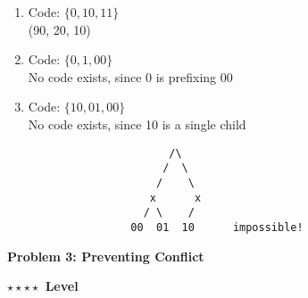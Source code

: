 \documentclass{article}\usepackage[utf8]{inputenc}
\begin{document}
\begin{enumerate}
\item Code: $\{0, 10, 11\}$
\BeginSolution %
\\
(90, 20, 10)
\EndSolution
\item Code: $\{0, 1, 00\}$
\BeginSolution %
\\
No code exists, since 0 is prefixing 00
\EndSolution
\item Code: $\{10, 01, 00\}$
\BeginSolution %
\\
No code exists, since 10 is a single child
%
\begin{lstlisting}
		              /\
		             /  \
		            /    \
		           x      x
		          / \    / 
		        00  01  10      impossible!
\end{lstlisting}
%
\EndSolution
\end{enumerate}

\clearpage

\vspace{-2mm}\noindent\begin{mybox}{\begin{center}\textbf{\color{black}Problem 3: Preventing Conflict}\end{center}}\end{mybox}\vspace{-2mm}
\begin{myboxot}\noindent\textbf{$\star\star\star\star$ Level}\end{myboxot} 
\end{document}
